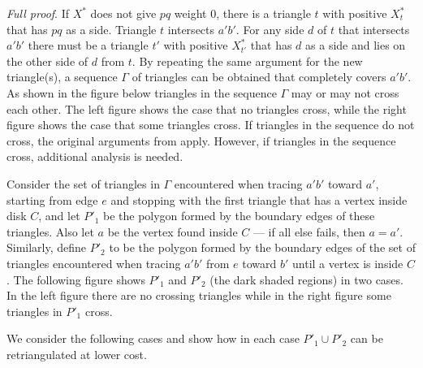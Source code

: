\documentclass[final]{siamltex}
\newcommand{\edge}{e}
\newcommand{\tri}{t}  \newcommand{\vertex}{v}
\newcommand{\fracTriang}{X}
\newcommand{\Picture}[1]{}
\newcommand{\xfigpdf}[1]{\Picture{#1.pdf_t}}
\newcommand{\xfig}[1]{\xfigpdf{#1}}
\newenvironment{fullproof}{\par{\it Full proof}. \ignorespaces}{\endproof}
\begin{document}
\begin{fullproof}
If $\fracTriang^*$ does not give $p q$ weight 0, there is a triangle $t$ with positive $\fracTriang^*_t$ 
that has $p q$ as a side. Triangle $t$ intersects $a' b'$.
For any side $d$ of $\tri$ that intersects $a' b'$ there must be a triangle $\tri'$ with positive $\fracTriang^*_{\tri'}$ 
that has $d$ as a side and lies on the other side of $d$ from $\tri$. By repeating the same argument 
for the new triangle(s), a sequence $\Gamma$ of triangles can be obtained that completely covers $a' b'$. 
As shown in the figure below triangles in the sequence $\Gamma$ may or may not cross each other.
The left figure shows the case that no triangles cross, while the right figure shows the case that some triangles cross. 
If triangles in the sequence do not cross, the original arguments from \cite{drysdale2001exclusion} apply.
However, if triangles in the sequence cross, additional analysis is needed.

\begin{center}
\scalebox{.65}
{
\xfig{sequence}
}
\end{center}
Consider the set of triangles in $\Gamma$ 
encountered when tracing $a' b'$ toward $a'$, starting from edge $\edge$ and stopping with the 
first triangle that has a vertex inside disk $C$, and let $P'_1$ be the polygon formed by the 
boundary edges of these triangles. Also let
$a$ be the vertex found inside $C$ --- if all else fails, then $a= a'$.
Similarly, define $P'_2$ to be the polygon formed by the boundary edges of the set of triangles encountered 
when tracing $a' b'$ from $\edge$ toward $b'$ until a 
vertex is inside $C$. The following figure shows $P'_1$ and $P'_2$ (the dark shaded regions) in two cases.
In the left figure there are no crossing triangles while in the right figure some triangles in $P'_1$ cross. 
\begin{center}
\scalebox{.7}
{
  \xfig{ABregion}
}
\end{center}


We consider the following cases and show how in each case $P'_1\cup P'_2$ can be retriangulated at lower cost.




\end{fullproof}
\end{document}
